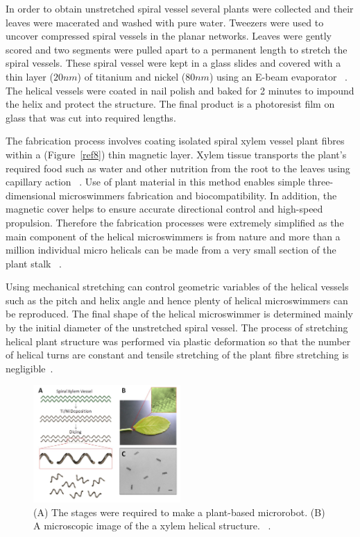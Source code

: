 \documentclass[12pt,a4paper,titlepage]{report}
\begin{document}
In order to obtain unstretched spiral vessel several plants were collected and their leaves were 
macerated and washed with pure water. Tweezers were used to uncover compressed spiral vessels 
in the planar networks. Leaves were gently scored and two segments were pulled apart to a permanent
 length to stretch the spiral vessels. These spiral vessel were kept in a glass slides and covered with a 
thin layer ($20 nm$) of titanium and nickel ($80 nm$) using an 
E-beam evaporator ~\citep{mahoney2011velocity}. The helical vessels were coated in nail 
polish and baked for 2 minutes to impound the helix and protect the structure. The final product is 
a photoresist film on glass that was cut into required lengths.      
  

The fabrication process involves coating isolated spiral xylem vessel plant fibres within a (Figure~\ref{ref8})
thin magnetic layer. Xylem tissue transports the plant\rq{}s required food such as water and other 
nutrition from the root to the leaves using capillary action ~\citep{mahoney2011velocity}.
Use of plant material in this method enables simple three-dimensional microswimmers fabrication 
and biocompatibility. In addition, the magnetic cover helps to ensure accurate directional control and 
high-speed propulsion. Therefore the fabrication processes were extremely simplified as the main 
component of the helical microswimmers is from nature and more than a million individual micro helicals 
can be made from a very small section of the plant stalk ~\citep{mahoney2011velocity}. 


Using mechanical stretching can control geometric variables of the helical vessels such as the pitch and
 helix angle and hence plenty of helical microswimmers can be reproduced. The final shape of the 
helical microswimmer is determined mainly by the initial diameter of the unstretched spiral vessel. The
 process of stretching helical plant structure was performed via plastic deformation so that the number 
of helical turns are constant and tensile stretching of the plant fibre stretching is negligible~\citep{mahoney2011velocity}. 


\begin{figure}
  \begin{center}
    \includegraphics[width=0.5\textwidth]{plants2}
  \caption{(A) The stages were required to make a plant-based microrobot. (B) A microscopic image of the 
a xylem helical structure. ~\citep{gao2013bioinspired}.}
  \label{plants2}
\end{center}
\end{figure}
\end{document}
